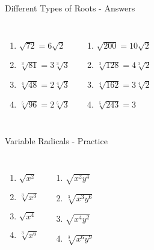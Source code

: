 \documentclass[aspectratio=169]{beamer}
\begin{document}
\begin{frame}{Different Types of Roots - Answers}
\begin{tcolorbox}[colback=lightgray,colframe=primary,title=Solutions]
\footnotesize
\begin{columns}[T]
\begin{enumerate}
  \item $\sqrt{72} = 6\sqrt{2}$
  \item $\sqrt[3]{81} = 3\sqrt[3]{3}$
  \item $\sqrt[4]{48} = 2\sqrt[4]{3}$
  \item $\sqrt[5]{96} = 2\sqrt[5]{3}$
\end{enumerate}
\begin{enumerate}
  \item $\sqrt{200} = 10\sqrt{2}$
  \item $\sqrt[3]{128} = 4\sqrt[3]{2}$
  \item $\sqrt[4]{162} = 3\sqrt[4]{2}$
  \item $\sqrt[5]{243} = 3$
\end{enumerate}
\end{columns}
\end{tcolorbox}
\end{frame}

\begin{frame}{Variable Radicals - Practice}
\begin{tcolorbox}[colback=lightgray,colframe=accent,title=Practice Problems]
\footnotesize
\begin{columns}[T]
\begin{enumerate}
  \item $\sqrt{x^2}$
  \item $\sqrt[3]{x^3}$
  \item $\sqrt{x^4}$
  \item $\sqrt[3]{x^6}$
\end{enumerate}
\begin{enumerate}
  \item $\sqrt{x^2y^4}$
  \item $\sqrt[3]{x^3y^6}$
  \item $\sqrt{x^4y^2}$
  \item $\sqrt[3]{x^6y^9}$
\end{enumerate}
\end{columns}
\end{tcolorbox}
\end{frame}
\end{document}
